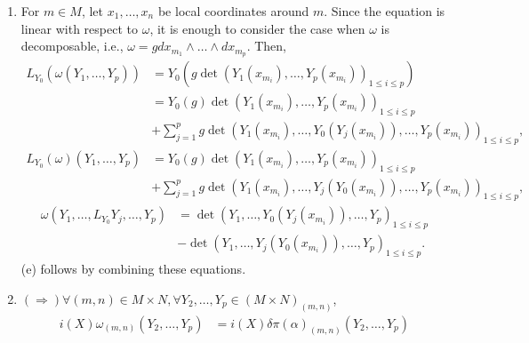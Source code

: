 \begin{enumerate}
\begin{align*}
& = \lim_{t \rightarrow 0^{+}} \frac{d^{2} g(t, t, t, t) / d t^{2}}{2}.
\end{align*}
Since
\[d g(t, t, t, t) /d t|_{t=0}= -Y_{m}(f)-X_{m}(f)+Y_{m}(f)+X_{m}(f)=0,\]
we have
\begin{align*}
\lim_{t \rightarrow 0^{+}} \frac{d^{2} g(t, t, t, t) / d t^{2}}{2}
& = \frac{1}{2}\left(Y_{m}(Y(f))+X_{m}(X(f))+Y_{m}(Y(f))+X_{m}(X(f))\right) \\
& +X_{m}(Y(f))-Y_{m}(Y(f))-X_{m}(Y(f))-Y_{m}(X(f)) \\
& -X_{m}(X(f))+X_{m}(Y(f)) \\
& = X_{m}(Y(f))-Y_{m}(X(f))=[X, Y]|_{m}(f).
\end{align*}
\item For $m \in M$, let $x_{1}, \ldots, x_{n}$ be local coordinates around $m$. 
Since the equation is linear with respect to $\omega$, it is enough to consider the case when $\omega$ is decomposable, i.e., $\omega=g d x_{m_{1}} \wedge \ldots \wedge d x_{m_{p}}$. Then,
\begin{align*}
L_{Y_{0}}(\omega(Y_{1}, \ldots, Y_{p})) &= Y_{0}(g \det(Y_{1}(x_{m_{i}}), \ldots, Y_{p}(x_{m_{i}}))_{1 \leq i \leq p}) \\
&= Y_{0}(g) \det(Y_{1}(x_{m_{i}}), \ldots, Y_{p}(x_{m_{i}}))_{1 \leq i \leq p} \\
&+\sum_{j=1}^{p} g \det(Y_{1}(x_{m_{i}}), \ldots, Y_{0}(Y_{j}(x_{m_{i}})), \ldots, Y_{p}(x_{m_{i}}))_{1 \leq i \leq p},
\end{align*}
\begin{align*}
L_{Y_{0}}(\omega)(Y_{1}, \ldots, Y_{p}) &= Y_{0}(g) \det(Y_{1}(x_{m_{i}}), \ldots, Y_{p}(x_{m_{i}}))_{1 \leq i \leq p} \\
&+\sum_{j=1}^{p} g \det(Y_{1}(x_{m_{i}}), \ldots, Y_{j}(Y_{0}(x_{m_{i}})), \ldots, Y_{p}(x_{m_{i}}))_{1 \leq i \leq p},
\end{align*}
\begin{align*}
\omega(Y_{1}, \ldots, L_{Y_{0}} Y_{j}, \ldots, Y_{p})
& =\det(Y_{1}, \ldots, Y_{0}(Y_{j}(x_{m_{i}})), \ldots, Y_{p})_{1 \leq i \leq p}\\
& -\det(Y_{1}, \ldots, Y_{j}(Y_{0}(x_{m_{i}})), \ldots, Y_{p})_{1 \leq i \leq p}.
\end{align*}
(e) follows by combining these equations.
\item $(\Rightarrow) \forall(m, n) \in M \times N, \forall Y_{2}, \ldots, Y_{p} \in(M \times N)_{(m, n)}$, 
\begin{align*}
i(X) \omega_{(m, n)}(Y_{2}, \ldots, Y_{p})
&=i(X) \delta \pi(\alpha)_{(m, n)}(Y_{2}, \ldots, Y_{p})\\

\end{align*}
\end{enumerate}
